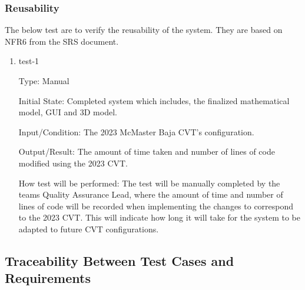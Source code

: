 \documentclass[12pt, titlepage]{article}
\begin{document}
\subsubsection{Reusability}

The below test are to verify the reusability of the system.
They are based on NFR6 from the SRS document.

\begin{enumerate}

\item{test-1\\}
    
Type: Manual
              
Initial State: Completed system which includes, the finalized mathematical model, GUI and 3D model.  
              
Input/Condition: The 2023 McMaster Baja CVT's configuration. 
              
Output/Result: The amount of time taken and number of lines of code modified using the 2023 CVT.
              
How test will be performed: The test will be manually completed by the teams Quality Assurance Lead, where the amount of time and number of lines of code will be recorded when implementing the changes to correspond to the 2023 CVT.
This will indicate how long it will take for the system to be adapted to future CVT configurations. 
    
\end{enumerate}

\subsection{Traceability Between Test Cases and Requirements}
\end{document}
